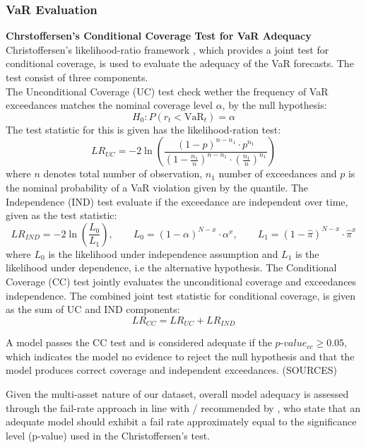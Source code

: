\subsubsection{VaR Evaluation} 
\textbf{Chrstoffersen's Conditional Coverage Test for VaR Adequacy} \\ 
Christoffersen's likelihood-ratio framework \parencite{christoffersen1998}, which provides a joint test for conditional coverage, is used to evaluate the adequacy of the VaR forecasts. The test consist of three components. \\ 
The Unconditional Coverage (UC) test check wether the frequency of VaR exceedances matches the nominal coverage level $\alpha$, by the null hypothesis: 
\begin{equation}
    H_0 : P(r_t < \text{VaR}_t) = \alpha
\end{equation}
The test statistic for this is given has the likelihood-ration test: 
\begin{equation}
    LR_{UC} = -2 \ln \left( \frac{ (1-p)^{n-n_1} \cdot p^{n_1} }{ \left(1 - \frac{n_1}{n} \right)^{n-n_1} \cdot \left( \frac{n_1}{n} \right)^{n_1} } \right)
\end{equation}
where $n$ denotes total number of observation, $n_1$ number of exceedances and $p$ is the nominal probability of a VaR violation given by the quantile. The Independence (IND) test evaluate if the exceedance are independent over time, given as the test statistic:  
\begin{equation}
    LR_{IND} = -2 \ln \left( \frac{L_0}{L_1} \right), \qquad  L_0 = (1 - \alpha)^{N-x} \cdot \alpha^x, \qquad L_1 = (1 - \hat{\pi})^{N-x} \cdot \hat{\pi}^x
\end{equation}
where $L_0$ is the likelihood under independence assumption and $L_1$ is the likelihood under dependence, i.e the alternative hypothesis. The Conditional Coverage (CC) test jointly evaluates the unconditional coverage and exceedances independence. The combined joint test statistic for conditional coverage, is given as the sum of UC and IND components:
\begin{equation}
    LR_{CC} = LR_{UC} + LR_{IND}
\end{equation}

A model passes the CC test and is considered adequate if the $p\text{-}value_{cc} \geq 0.05$, which indicates the model no evidence to reject the null hypothesis and that the model produces correct coverage and independent exceedances. (SOURCES) 

Given the multi-asset nature of our dataset, overall model adequacy is assessed through the fail-rate approach in line with / recommended by \textcite{Bayer2020}, who state that an adequate model should exhibit a fail rate approximately equal to the significance level (p-value) used in the Christoffersen's test.

